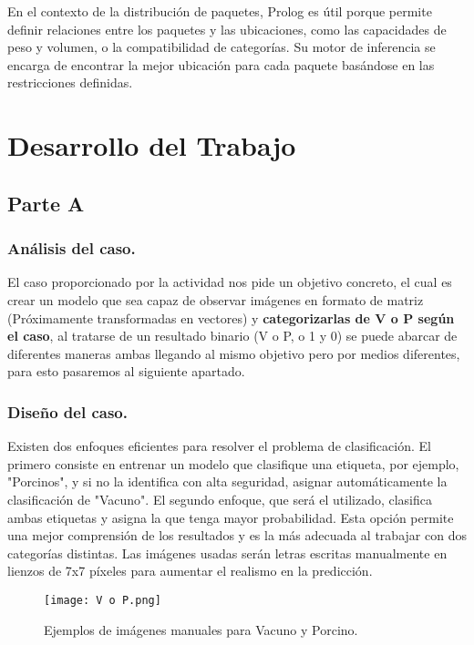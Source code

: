 \documentclass[12pt]{article}
\begin{document}
En el contexto de la distribución de paquetes, Prolog es útil porque permite definir relaciones entre los paquetes y las ubicaciones, como las capacidades de peso y volumen, o la compatibilidad de categorías. Su motor de inferencia se encarga de encontrar la mejor ubicación para cada paquete basándose en las restricciones definidas. 


\section{Desarrollo del Trabajo}
\subsection{Parte A}
\subsubsection{Análisis del caso.}
El caso proporcionado por la actividad nos pide un objetivo concreto, el cual es crear un modelo que sea capaz de observar imágenes en formato de matriz (Próximamente transformadas en vectores) y \textbf{categorizarlas de V o P según el caso}, al tratarse de un resultado binario (V o P, o 1 y 0) se puede abarcar de diferentes maneras ambas llegando al mismo objetivo pero por medios diferentes, para esto pasaremos al siguiente apartado.

\subsubsection{Diseño del caso.}
Existen dos enfoques eficientes para resolver el problema de clasificación. El primero consiste en entrenar un modelo que clasifique una etiqueta, por ejemplo, "Porcinos", y si no la identifica con alta seguridad, asignar automáticamente la clasificación de "Vacuno". El segundo enfoque, que será el utilizado, clasifica ambas etiquetas y asigna la que tenga mayor probabilidad. Esta opción permite una mejor comprensión de los resultados y es la más adecuada al trabajar con dos categorías distintas. Las imágenes usadas serán letras escritas manualmente en lienzos de 7x7 píxeles para aumentar el realismo en la predicción.

\begin{figure}[h]
    \centering
    \texttt{[image: V o P.png]} 
    \caption{ Ejemplos de imágenes manuales para Vacuno y Porcino.}
    \label{fig:Vacuno_Porcino}
\end{figure}
\end{document}

